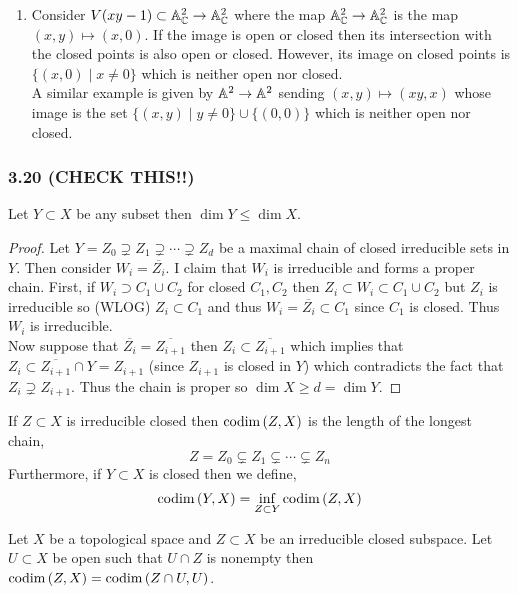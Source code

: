 \documentclass[12pt]{article}
\begin{document}
\begin{enumerate}
\item Consider $V(xy - 1) \subset \mathbb{A}^2_{\mathbb{C}} \to \mathbb{A}^2_{\mathbb{C}}$ where the map $\mathbb{A}^2_{\mathbb{C}} \to \mathbb{A}^2_{\mathbb{C}}$ is the map $(x,y) \mapsto (x, 0)$. If the image is open or closed then its intersection with the closed points is also open or closed. However, its image on closed points is $\{ (x,0) \mid x \neq 0 \}$ which is neither open nor closed.
\bigskip\\
A similar example is given by $\mathbb{A}^2 \to \mathbb{A}^2$ sending $(x,y) \mapsto (xy, x)$ whose image is the set $ \{ (x,y) \mid y \neq 0 \} \cup \{ (0, 0) \}$ which is neither open nor closed.
\end{enumerate}

\subsubsection{3.20 (CHECK THIS!!)}

\begin{lemma}
Let $Y \subset X$ be any subset then $\dim{Y} \le \dim{X}$. 
\end{lemma}

\begin{proof}
Let $Y = Z_0 \supsetneq Z_1 \supsetneq \cdots \supsetneq Z_d$ be a maximal chain of closed irreducible sets in $Y$. Then consider $W_i = \overline{Z_i}$. I claim that $W_i$ is irreducible and forms a proper chain. First, if $W_i \supset C_1 \cup C_2$ for closed $C_1, C_2$ then $Z_i \subset W_i \subset C_1 \cup C_2$ but $Z_i$ is irreducible so (WLOG) $Z_i \subset C_1$ and thus $W_i = \overline{Z_i} \subset C_1$ since $C_1$ is closed. Thus $W_i$ is irreducible. 
\bigskip\\
Now suppose that $\overline{Z_i} = \overline{Z_{i+1}}$ then $Z_i \subset \overline{Z_{i+1}}$ which implies that $Z_i \subset \overline{Z_{i + 1}} \cap Y = Z_{i + 1}$ (since $Z_{i + 1}$ is closed in $Y$) which contradicts the fact that $Z_i \supsetneq Z_{i+1}$. Thus the chain is proper so $\dim{X} \ge d = \dim{Y}$.  
\end{proof}

\begin{definition}
If $Z \subset X$ is irreducible closed then $\mathrm{codim}\left( Z,X \right)$ is the length of the longest chain,
\[ Z = Z_0 \subsetneq Z_1 \subsetneq \cdots \subsetneq Z_n \]
Furthermore, if $Y \subset X$ is closed then we define,
\[ \mathrm{codim}\left( Y, X \right) = \inf_{Z \subset Y} \mathrm{codim}\left( Z, X \right) \]
\end{definition}

\begin{lemma}
Let $X$ be a topological space and $Z \subset X$ be an irreducible closed subspace. Let $U \subset X$ be open such that $U \cap Z$ is nonempty then $\mathrm{codim}\left( Z, X \right) = \mathrm{codim}\left( Z \cap U, U \right)$.
\end{lemma}
\end{document}
